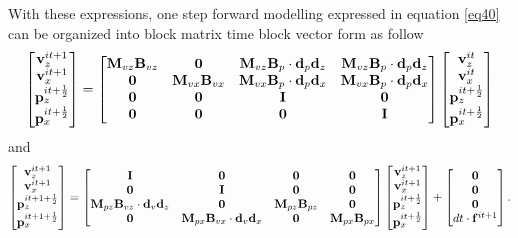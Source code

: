 \documentclass[revised,endfloat]{geophysics}
\begin{document}
With these expressions, one step forward modelling expressed in equation \ref{eq40} can be organized into block matrix time block vector form as follow
\begin{equation}
\begin{bmatrix}
{\bf v}_z^{it+1} \\
{\bf v}_x^{it+1} \\
{\bf p}_z^{it+\frac{1}{2}} \\
{\bf p}_x^{it+\frac{1}{2}} \\
\end{bmatrix} = 
\begin{bmatrix}
{\bf M}_{vz}{\bf B}_{vz} & \bf{0} & {\bf M}_{vz}{\bf B}_{p} \cdot {\bf d}_p{\bf d}_z & {\bf M}_{vz}{\bf B}_{p} \cdot {\bf d}_p{\bf d}_z  \\
\bf{0} & {\bf M}_{vx}{\bf B}_{vx} & {\bf M}_{vx}{\bf B}_{p} \cdot {\bf d}_p{\bf d}_x & {\bf M}_{vx}{\bf B}_{p} \cdot {\bf d}_p{\bf d}_x \\
\bf{0}   & \bf{0}   & \bf{I}   & \bf{0}   \\
\bf{0}   & \bf{0}   & \bf{0}  & \bf{I}    \\
\end{bmatrix}
\begin{bmatrix}
{\bf v}_z^{it} \\
{\bf v}_x^{it} \\
{\bf p}_z^{it+\frac{1}{2}} \\
{\bf p}_x^{it+\frac{1}{2}}
\end{bmatrix}
\label{eq42}
\end{equation}
and
\begin{equation}
\begin{bmatrix}
{\bf v}_z^{it+1} \\
{\bf v}_x^{it+1} \\
{\bf p}_z^{it+1+\frac{1}{2}} \\
{\bf p}_x^{it+1+\frac{1}{2}} \\
\end{bmatrix}
=\begin{bmatrix}
\bf{I}   & \bf{0}   & \bf{0} & \bf{0}   \\
\bf{0}   & \bf{I}   & \bf{0} & \bf{0}   \\
{\bf M}_{pz}{\bf B}_{vz} \cdot {\bf d}_v{\bf d}_z & \bf{0} & {\bf M}_{pz}{\bf B}_{pz} & \bf{0}   \\ 
\bf{0} & {\bf M}_{px}{\bf B}_{vx} \cdot {\bf d}_v{\bf d}_x & \bf{0} & {\bf M}_{px}{\bf B}_{px} \\ 
\end{bmatrix}
\begin{bmatrix}
{\bf v}_z^{it+1} \\
{\bf v}_x^{it+1} \\
{\bf p}_z^{it+\frac{1}{2}} \\
{\bf p}_x^{it+\frac{1}{2}} \\
\end{bmatrix}
+
\begin{bmatrix}
{\bf 0} \\
{\bf 0} \\
{\bf 0} \\
dt \cdot {\bf f}^{it+1} \\
\end{bmatrix}.
\label{eq43}
\end{equation}
\end{document}
